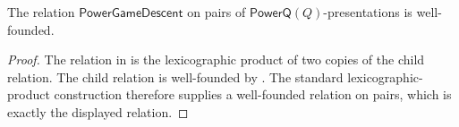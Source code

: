 \begin{lemma}
The relation $\mathsf{PowerGameDescent}$ on pairs of
$\mathsf{PowerQ}(Q)$-presentations is well-founded.
\end{lemma}
\begin{proof}
The relation in  is the lexicographic product of
two copies of the child relation.  The child relation is well-founded by
.  The standard lexicographic-product
construction therefore supplies a well-founded relation on pairs, which is
exactly the displayed relation.
\end{proof}

